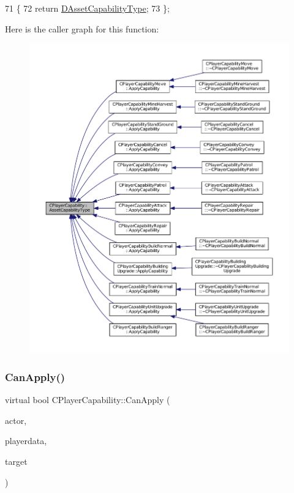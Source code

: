 \begin{DoxyCode}
71                                                         \{
72             \textcolor{keywordflow}{return} \hyperlink{classCPlayerCapability_a09011bc8c74c698bfb65f06a1840c6e1}{DAssetCapabilityType};
73         \};
\end{DoxyCode}
Here is the caller graph for this function\+:
\nopagebreak
\begin{figure}[H]
\begin{center}
\leavevmode
\includegraphics[width=350pt]{classCPlayerCapability_a433bb196cd6ab6a932f1cac102b3aa98_icgraph}
\end{center}
\end{figure}
\hypertarget{classCPlayerCapability_ae96263e0950f496492f8baeb877b9554}{}\label{classCPlayerCapability_ae96263e0950f496492f8baeb877b9554} 
\subsubsection{\texorpdfstring{Can\+Apply()}{CanApply()}}
{\footnotesize\ttfamily virtual bool C\+Player\+Capability\+::\+Can\+Apply (\begin{DoxyParamCaption}\item[{std\+::shared\+\_\+ptr$<$ \hyperlink{classCPlayerAsset}{C\+Player\+Asset} $>$}]{actor,  }\item[{std\+::shared\+\_\+ptr$<$ \hyperlink{classCPlayerData}{C\+Player\+Data} $>$}]{playerdata,  }\item[{std\+::shared\+\_\+ptr$<$ \hyperlink{classCPlayerAsset}{C\+Player\+Asset} $>$}]{target }\end{DoxyParamCaption})\hspace{0.3cm}{\ttfamily [pure virtual]}}



